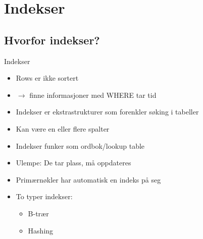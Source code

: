 \section{Indekser}
\subsection*{Hvorfor indekser?}
\begin{frame}{Indekser}
    \begin{itemize}[<+->]
        \item Rows er ikke sortert
        \item $\rightarrow$ finne informasjoner med WHERE tar tid
        \item Indekser er ekstrastrukturer som forenkler søking i tabeller
        \item Kan være en eller flere spalter
        \item Indekser funker som ordbok/lookup table
        \item Ulempe: De tar plass, må oppdateres
        \item Primærnøkler har automatisk en indeks på seg
        \item To typer indekser:
            \begin{itemize}
                \item B-trær
                \item Hashing
            \end{itemize}
    \end{itemize}
\end{frame}

